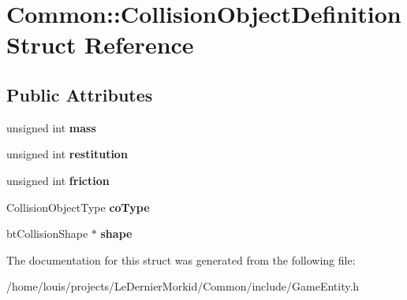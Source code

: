 \hypertarget{struct_common_1_1_collision_object_definition}{}\section{Common\+:\+:Collision\+Object\+Definition Struct Reference}
\label{struct_common_1_1_collision_object_definition}
\subsection*{Public Attributes}
\begin{DoxyCompactItemize}
\item 
\mbox{\label{struct_common_1_1_collision_object_definition_a472145ada80dba6a8d1831246b0ed2c3}} 
unsigned int {\bfseries mass}
\item 
\mbox{\label{struct_common_1_1_collision_object_definition_a84df96597dafbddce2bd7f8e0a8770a3}} 
unsigned int {\bfseries restitution}
\item 
\mbox{\label{struct_common_1_1_collision_object_definition_a8cf81893bc2b5cd90861239c9a758c68}} 
unsigned int {\bfseries friction}
\item 
\mbox{\label{struct_common_1_1_collision_object_definition_a9528a6850d27727bc573460430c63cf2}} 
Collision\+Object\+Type {\bfseries co\+Type}
\item 
\mbox{\label{struct_common_1_1_collision_object_definition_a9ce0f0e3eb7b066ee634bcbec7cce193}} 
bt\+Collision\+Shape $\ast$ {\bfseries shape}
\end{DoxyCompactItemize}


The documentation for this struct was generated from the following file\+:\begin{DoxyCompactItemize}
\item 
/home/louis/projects/\+Le\+Dernier\+Morkid/\+Common/include/Game\+Entity.\+h\end{DoxyCompactItemize}
